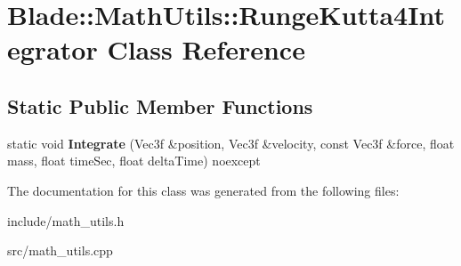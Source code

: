 \hypertarget{class_blade_1_1_math_utils_1_1_runge_kutta4_integrator}{}\section{Blade\+:\+:Math\+Utils\+:\+:Runge\+Kutta4\+Integrator Class Reference}
\label{class_blade_1_1_math_utils_1_1_runge_kutta4_integrator}
\subsection*{Static Public Member Functions}
\begin{DoxyCompactItemize}
\item 
\mbox{\label{class_blade_1_1_math_utils_1_1_runge_kutta4_integrator_ac3f3e8e7203695a4511b1935837d49f3}} 
static void {\bfseries Integrate} (Vec3f \&position, Vec3f \&velocity, const Vec3f \&force, float mass, float time\+Sec, float delta\+Time) noexcept
\end{DoxyCompactItemize}


The documentation for this class was generated from the following files\+:\begin{DoxyCompactItemize}
\item 
include/math\+\_\+utils.\+h\item 
src/math\+\_\+utils.\+cpp\end{DoxyCompactItemize}
